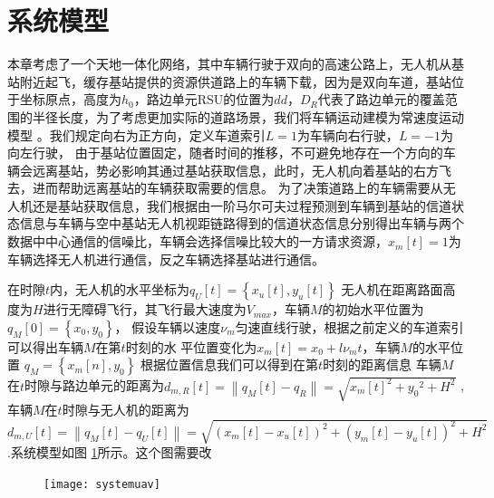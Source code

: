 \section{系统模型}\label{section4-2}
本章考虑了一个天地一体化网络，其中车辆行驶于双向的高速公路上，无人机从基站附近起飞，缓存基站提供的资源供道路上的车辆下载，因为是双向车道，基站位于坐标原点，高度为$h_0$，路边单元RSU的位置为$dd$，$D_R$代表了路边单元的覆盖范围的半径长度，为了考虑更加实际的道路场景，我们将车辆运动建模为常速度运动模型 \cite{Fiore2008TheNS}。我们规定向右为正方向，定义车道索引$L=1$为车辆向右行驶，$L=-1$为向左行驶，
由于基站位置固定，随者时间的推移，不可避免地存在一个方向的车辆会远离基站，势必影响其通过基站获取信息，此时，无人机向着基站的右方飞去，进而帮助远离基站的车辆获取需要的信息。
为了决策道路上的车辆需要从无人机还是基站获取信息，我们根据由一阶马尔可夫过程预测到车辆到基站的信道状态信息与车辆与空中基站无人机视距链路得到的信道状态信息分别得出车辆与两个数据中中心通信的信噪比，车辆会选择信噪比较大的一方请求资源，$x_m\left[t\right]=1$为车辆选择无人机进行通信，反之车辆选择基站进行通信。

在时隙$t$内，无人机的水平坐标为$q_U\left[t\right]=\left\{x_u\left[t\right],y_u\left[t\right]\right\}$
无人机在距离路面高度为$H$进行无障碍飞行，其飞行最大速度为$V_{max}$，车辆$M$的初始水平位置为$q_M\left[0\right]=\left\{x_0,y_0\right\}$，
假设车辆以速度$\nu_m$匀速直线行驶，根据之前定义的车道索引可以得出车辆$M$在第$t$时刻的水
平位置变化为$x_m\left[t\right]=x_0+l\nu_m t$，车辆$M$的水平位置 $q_M=\left\{x_m\left[n\right],y_0\right\}$
根据位置信息我们可以得到在第$t$时刻的距离信息
车辆$M$在$t$时隙与路边单元的距离为${{d}_{m,R}}\left[ t \right]=\left\| {{q}_{M}}\left[ t \right]-{{q}_{R}} \right\|=\sqrt{{{x}_{m}}{{\left[ t \right]}^{2}}+{{y}_{0}}^{2}+{{H}^{2}}}$
,车辆$M$在$t$时隙与无人机的距离为
$
{{d}_{m,U}}\left[ t \right]=\left\| {{q}_{M}}\left[ t \right]-{{q}_{U}}\left[ t \right] \right\|=\sqrt{{{\left( {{x}_{m}}\left[ t \right]-{{x}_{u}}\left[ t \right] \right)}^{2}}+{{\left( {{y}_{m}}\left[ t \right]-{{y}_{u}}\left[ t \right] \right)}^{2}}+{{H}^{2}}}\
$.系统模型如图 \ref{systemuav}所示。\textcolor[RGB]{18,220,168}{这个图需要改}
\begin{figure}[hptb!]
 \centering\small
 \texttt{[image: systemuav]}
 \label{systemuav}
\end{figure}

